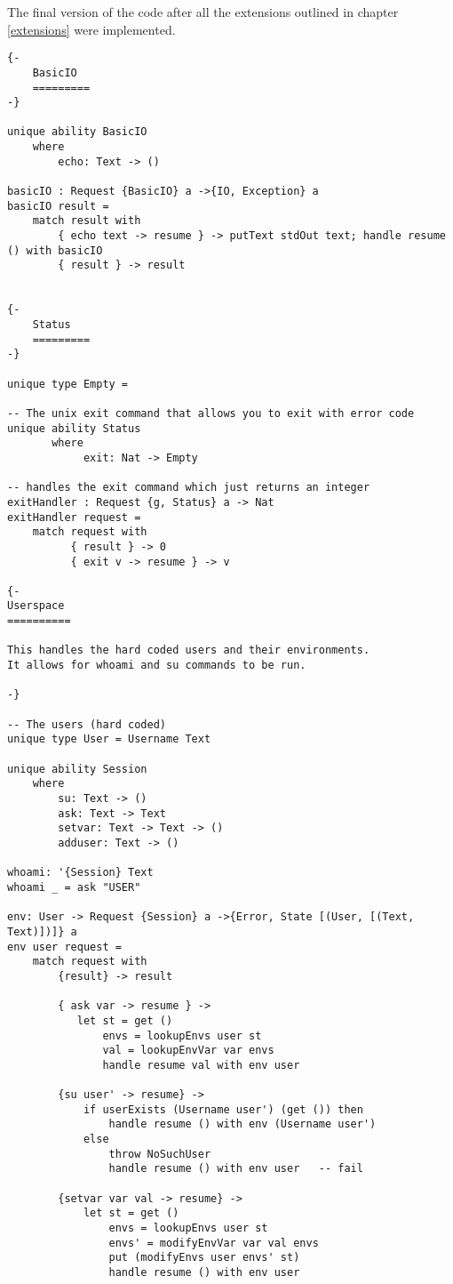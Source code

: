 \documentclass[logo,bsc,singlespacing,parskip]{infthesis}
\begin{document}
The final version of the code after all the extensions outlined in chapter \ref{extensions} were implemented.

\begin{lstlisting}[language=unison]
{-
    BasicIO
    =========
-}

unique ability BasicIO
    where
        echo: Text -> ()

basicIO : Request {BasicIO} a ->{IO, Exception} a
basicIO result =
    match result with
        { echo text -> resume } -> putText stdOut text; handle resume () with basicIO
        { result } -> result


{-
    Status
    =========
-}

unique type Empty = 

-- The unix exit command that allows you to exit with error code
unique ability Status
       where
            exit: Nat -> Empty

-- handles the exit command which just returns an integer
exitHandler : Request {g, Status} a -> Nat
exitHandler request =
    match request with
          { result } -> 0
          { exit v -> resume } -> v

{-
Userspace
==========

This handles the hard coded users and their environments.
It allows for whoami and su commands to be run.

-}

-- The users (hard coded)
unique type User = Username Text

unique ability Session
    where
        su: Text -> ()
        ask: Text -> Text
        setvar: Text -> Text -> ()
        adduser: Text -> ()

whoami: '{Session} Text
whoami _ = ask "USER"

env: User -> Request {Session} a ->{Error, State [(User, [(Text, Text)])]} a
env user request = 
    match request with
        {result} -> result

        { ask var -> resume } -> 
           let st = get ()
               envs = lookupEnvs user st
               val = lookupEnvVar var envs
               handle resume val with env user

        {su user' -> resume} -> 
            if userExists (Username user') (get ()) then
                handle resume () with env (Username user')
            else
                throw NoSuchUser
                handle resume () with env user   -- fail

        {setvar var val -> resume} -> 
            let st = get ()
                envs = lookupEnvs user st
                envs' = modifyEnvVar var val envs
                put (modifyEnvs user envs' st) 
                handle resume () with env user


\end{lstlisting}
\end{document}
